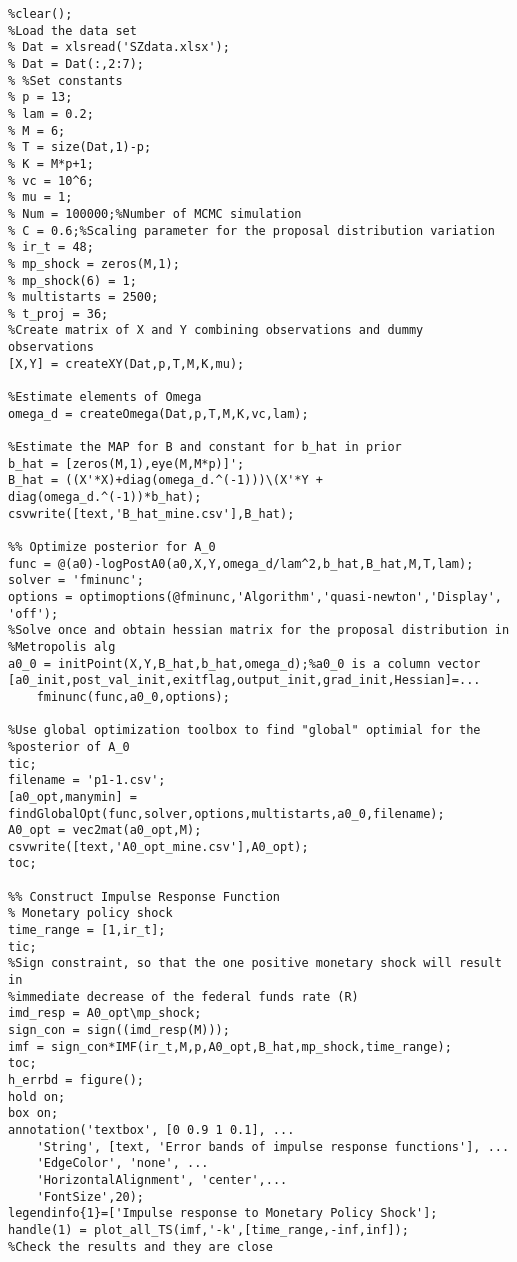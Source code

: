 \documentclass[11pt, oneside]{article}   	%
\begin{document}
\begin{appendices}
\begin{lstlisting}
%clear();
%Load the data set
% Dat = xlsread('SZdata.xlsx');
% Dat = Dat(:,2:7);
% %Set constants
% p = 13;
% lam = 0.2;
% M = 6;
% T = size(Dat,1)-p;
% K = M*p+1;
% vc = 10^6;
% mu = 1;
% Num = 100000;%Number of MCMC simulation
% C = 0.6;%Scaling parameter for the proposal distribution variation
% ir_t = 48;
% mp_shock = zeros(M,1);
% mp_shock(6) = 1;
% multistarts = 2500;
% t_proj = 36;
%Create matrix of X and Y combining observations and dummy observations
[X,Y] = createXY(Dat,p,T,M,K,mu);

%Estimate elements of Omega
omega_d = createOmega(Dat,p,T,M,K,vc,lam);

%Estimate the MAP for B and constant for b_hat in prior
b_hat = [zeros(M,1),eye(M,M*p)]';
B_hat = ((X'*X)+diag(omega_d.^(-1)))\(X'*Y + diag(omega_d.^(-1))*b_hat);
csvwrite([text,'B_hat_mine.csv'],B_hat);

%% Optimize posterior for A_0
func = @(a0)-logPostA0(a0,X,Y,omega_d/lam^2,b_hat,B_hat,M,T,lam);
solver = 'fminunc';
options = optimoptions(@fminunc,'Algorithm','quasi-newton','Display', 'off');
%Solve once and obtain hessian matrix for the proposal distribution in
%Metropolis alg
a0_0 = initPoint(X,Y,B_hat,b_hat,omega_d);%a0_0 is a column vector
[a0_init,post_val_init,exitflag,output_init,grad_init,Hessian]=...
    fminunc(func,a0_0,options);

%Use global optimization toolbox to find "global" optimial for the
%posterior of A_0
tic;
filename = 'p1-1.csv';
[a0_opt,manymin] = findGlobalOpt(func,solver,options,multistarts,a0_0,filename);
A0_opt = vec2mat(a0_opt,M);
csvwrite([text,'A0_opt_mine.csv'],A0_opt);
toc;

%% Construct Impulse Response Function
% Monetary policy shock
time_range = [1,ir_t];
tic;
%Sign constraint, so that the one positive monetary shock will result in
%immediate decrease of the federal funds rate (R)
imd_resp = A0_opt\mp_shock;
sign_con = sign((imd_resp(M)));
imf = sign_con*IMF(ir_t,M,p,A0_opt,B_hat,mp_shock,time_range);
toc;
h_errbd = figure();
hold on;
box on;
annotation('textbox', [0 0.9 1 0.1], ...
    'String', [text, 'Error bands of impulse response functions'], ...
    'EdgeColor', 'none', ...
    'HorizontalAlignment', 'center',...
    'FontSize',20);
legendinfo{1}=['Impulse response to Monetary Policy Shock'];
handle(1) = plot_all_TS(imf,'-k',[time_range,-inf,inf]);
%Check the results and they are close


\end{lstlisting}
\end{appendices}
\end{document}
